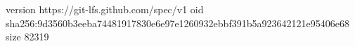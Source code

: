 version https://git-lfs.github.com/spec/v1
oid sha256:9d3560b3eeba74481917830e6e97e1260932ebbf391b5a923642121e95406e68
size 82319
